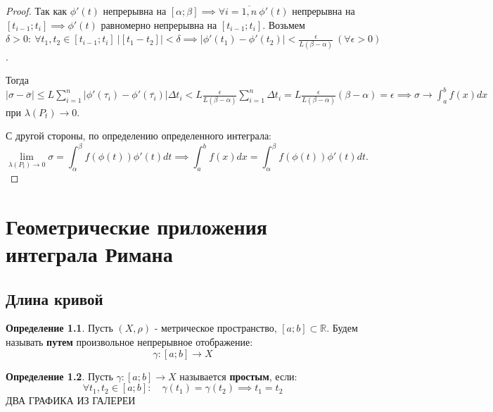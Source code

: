 \documentclass{report}
\theoremstyle{definition}
\newtheorem{definition}{Определение}[section]
\begin{document}
\begin{proof}
  Так как $\phi'(t)$ непрерывна на $[\alpha;\beta] \implies \forall i = \overline{1,n} \ 
  \phi'(t)$ непрерывна на $[t_{i-1}; t_i] \implies \phi'(t)$ равномерно непрерывна на $[t_{i-1}; t_i]$.
  Возьмем $\delta > 0 : \ \forall t_1, t_2 \in [t_{i-1}; t_i] \ | [t_1 - t_2] | < \delta \implies
  | \phi'(t_1) - \phi'(t_2) | < \frac{\epsilon}{L(\beta - \alpha)} \ (\forall \epsilon > 0)$.

  Тогда $| \sigma - \overline{\sigma} | \leqslant L\sum_{i=1}^{n} | \phi'(\tau_i) - \phi'(\overline{
  \tau_i}) | \Delta t_i < L\frac{\epsilon}{L(\beta - \alpha)}\sum_{i=1}^{n}\Delta t_i = L
  \frac{\epsilon}{L(\beta - \alpha)}(\beta - \alpha) = \epsilon \implies \sigma \rightarrow
  \int_{a}^{b}f(x)dx$ при $\lambda(P_t) \rightarrow 0$.

  С другой стороны, по определению определенного интеграла:
  \begin{equation*}
    \underset{\lambda(P_t)\rightarrow0}{\lim}
    \sigma = \int_{\alpha}^{\beta}f(\phi(t))\phi'(t)dt \implies \int_{a}^{b}f(x)dx = \int_{\alpha}^{\beta}
    f(\phi(t))\phi'(t)dt.
  \end{equation*}
\end{proof}

\chapter{Геометрические приложения интеграла Римана}

\section{Длина кривой}

\begin{definition}
  Пусть $(X,\rho)$ - метрическое пространство, $[a;b] \subset \mathbb{R}$. Будем называть \textbf{путем}
  произвольное непрерывное отображение:
  \begin{equation*}
    \gamma:[a;b]\rightarrow X
  \end{equation*}
\end{definition}

\begin{definition}
  Пусть $\gamma:[a;b]\rightarrow X$ называется \textbf{простым}, если:
  \begin{equation*}
    \forall t_1,t_2 \in[a;b]: \quad \gamma(t_1) = \gamma(t_2) \implies t_1 = t_2
  \end{equation*}
  {\Large ДВА ГРАФИКА ИЗ ГАЛЕРЕИ}
\end{definition}
\end{document}

